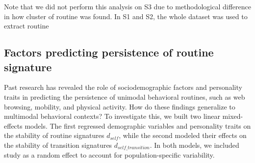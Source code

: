 \documentclass[pdflatex,sn-vancouver,Numbered]{bst/sn-jnl}%
\theoremstyle{thmstyleone}%
\theoremstyle{thmstyletwo}%
\theoremstyle{thmstylethree}%
\begin{document}
Note that we did not perform this analysis on S3 due to methodological difference in how cluster of routine was found. In S1 and S2, the whole dataset was used to extract routine 

\subsection*{Factors predicting persistence of routine signature}\label{sec3.3}

Past research has revealed the role of sociodemographic factors \cite{luong2023impact, luong2024sleep, kulshrestha2021web} and personality traits \cite{centellegherPersonalityTraitsEgonetwork2017, alessandrettiUnderstandingInterplaySocial2018, amon2022flexibility} in predicting the persistence of unimodal behavioral routines, such as web browsing, mobility, and physical activity. How do these findings generalize to multimodal behavioral contexts? To investigate this, we built two linear mixed-effects models. The first regressed demographic variables and personality traits on the stability of routine signatures $d_{self}$, while the second modeled their effects on the stability of transition signatures $d_{self\_transition}$. In both models, we included study as a random effect to account for population-specific variability.
\end{document}
